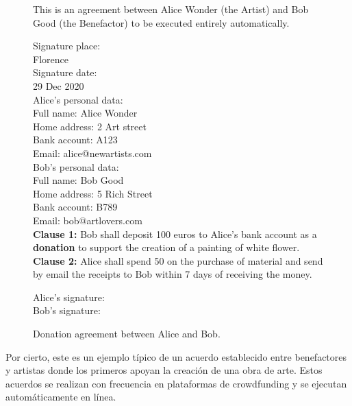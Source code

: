 \documentclass[12pt]{report} %
\begin{document}
\begin{figure}
\begin{tcolorbox}[width=\textwidth,
   title={Agreement between Alice and Bob.},
   colframe=black!75!white,
   colbacktitle=gray!50!white, coltitle=black,
   colupper=black,    colback=green!5!white]

 This is an agreement between Alice Wonder (the Artist)
 and Bob Good (the Benefactor) to be executed entirely
 automatically.

\vspace{0.5cm}
Signature place: \\
Florence\\

Signature date:\\
29 Dec 2020 \\

Alice's personal data: \\
Full name:  Alice Wonder \\
Home address: 2 Art street \\
Bank account: A123 \\
Email: alice@newartists.com \\

Bob's personal data: \\
Full name: Bob Good \\
Home address: 5 Rich Street \\
Bank account: B789 \\
Email: bob@artlovers.com \\



\textbf{Clause 1:}  Bob shall deposit 100 euros to Alice's bank
  account as a \textbf{donation} to support the creation of a painting of
  white flower. \\

\textbf{Clause 2:}  Alice shall spend 50 on the purchase of
  material and send by email the receipts to Bob
  within 7 days of receiving the money.

\vspace{0.5 cm}
Alice's signature: \\

Bob's signature:  \\
\end{tcolorbox}
\caption{Donation agreement between Alice and Bob.}
\label{box:agreedonate}
\end{figure}




Por cierto, este es un ejemplo típico de un acuerdo establecido entre benefactores y artistas donde los primeros apoyan la creación de una obra de arte. Estos acuerdos se realizan con frecuencia en plataformas de crowdfunding y se ejecutan automáticamente en línea.
\end{document}
